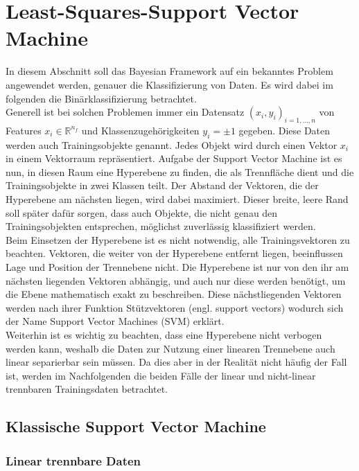 \newpage
\thispagestyle{plain}
\section{Least-Squares-Support Vector Machine}

In diesem Abschnitt soll das Bayesian Framework auf ein bekanntes Problem angewendet werden, genauer die Klassifizierung von Daten. Es wird dabei im folgenden die Binärklassifizierung betrachtet.\\
Generell ist bei solchen Problemen immer ein Datensatz \((x_i,y_i)_{i=1,\dots,n}\) von Features \(x_i\in\mathbb{R}^{n_f}\) und Klassenzugehörigkeiten \(y_i=\pm1\) gegeben. Diese Daten werden auch Trainingsobjekte genannt. Jedes Objekt wird durch einen Vektor \(x_i\) in einem Vektorraum repräsentiert. Aufgabe der Support Vector Machine ist es nun, in diesen Raum eine Hyperebene zu finden, die als Trennfläche dient und die Trainingsobjekte in zwei Klassen teilt. Der Abstand der Vektoren, die der Hyperebene am nächsten liegen, wird dabei maximiert. Dieser breite, leere Rand soll später dafür sorgen, dass auch Objekte, die nicht genau den Trainingsobjekten entsprechen, möglichst zuverlässig klassifiziert werden.\\[0,5cm]
Beim Einsetzen der Hyperebene ist es nicht notwendig, alle Trainingsvektoren zu beachten. Vektoren, die weiter von der Hyperebene entfernt liegen, beeinflussen Lage und Position der Trennebene nicht. Die Hyperebene ist nur von den ihr am nächsten liegenden Vektoren abhängig, und auch nur diese werden benötigt, um die Ebene mathematisch exakt zu beschreiben. Diese nächstliegenden Vektoren werden nach ihrer Funktion Stützvektoren (engl. support vectors) wodurch sich der Name Support Vector Machines (SVM) erklärt. \\[0,5cm]
Weiterhin ist es wichtig zu beachten, dass eine Hyperebene nicht verbogen werden kann, weshalb die Daten zur Nutzung einer linearen Trennebene auch linear separierbar sein müssen. Da dies aber in der Realität nicht häufig der Fall ist, werden im Nachfolgenden die beiden Fälle der linear und nicht-linear trennbaren Trainingsdaten betrachtet.

\subsection{Klassische Support Vector Machine}

\subsubsection{Linear trennbare Daten}

